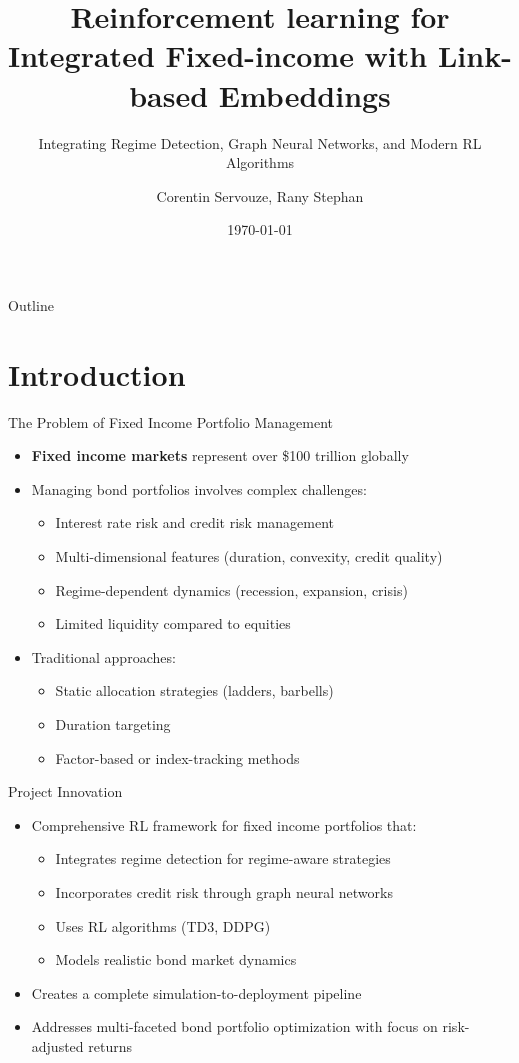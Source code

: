\documentclass{beamer}
\title{Reinforcement learning for Integrated Fixed-income with Link-based Embeddings}
\subtitle{Integrating Regime Detection, Graph Neural Networks, and Modern RL Algorithms}
\author{Corentin Servouze, Rany Stephan}
\date{\today}
\begin{document}
\begin{frame}
\titlepage
\end{frame}

\begin{frame}{Outline}
\tableofcontents
\end{frame}

\section{Introduction}

\begin{frame}{The Problem of Fixed Income Portfolio Management}
\begin{itemize}
    \item \textbf{Fixed income markets} represent over \$100 trillion globally
    \item Managing bond portfolios involves complex challenges:
    \begin{itemize}
        \item Interest rate risk and credit risk management
        \item Multi-dimensional features (duration, convexity, credit quality)
        \item Regime-dependent dynamics (recession, expansion, crisis)
        \item Limited liquidity compared to equities
    \end{itemize}
    \item Traditional approaches:
    \begin{itemize}
        \item Static allocation strategies (ladders, barbells)
        \item Duration targeting
        \item Factor-based or index-tracking methods
    \end{itemize}
\end{itemize}
\end{frame}



\begin{frame}{Project Innovation}
\begin{itemize}
    \item Comprehensive RL framework for fixed income portfolios that:
    \begin{itemize}
        \item Integrates regime detection for regime-aware strategies
        \item Incorporates credit risk through graph neural networks
        \item Uses RL algorithms (TD3, DDPG)
        \item Models realistic bond market dynamics
    \end{itemize}
    \item Creates a complete simulation-to-deployment pipeline
    \item Addresses multi-faceted bond portfolio optimization with focus on risk-adjusted returns
\end{itemize}
\end{frame}
\end{document}
